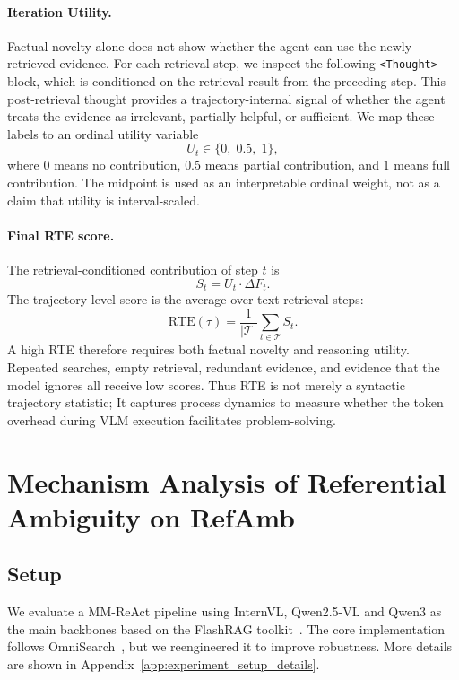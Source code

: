 \documentclass{article} %
\newcommand{\rte}{\mathrm{RTE}}
\newcommand{\df}{\Delta F}
\begin{document}
\paragraph{Iteration Utility.}
Factual novelty alone does not show whether the agent can use the newly retrieved evidence.
For each retrieval step, we inspect the following \texttt{<Thought>} block, which is conditioned on the retrieval result from the preceding step.
This post-retrieval thought provides a trajectory-internal signal of whether the agent treats the evidence as irrelevant, partially helpful, or sufficient.
We map these labels to an ordinal utility variable
\begin{equation}
    U_t \in \{0,\;0.5,\;1\},
    \label{eq:u_t}
\end{equation}
where $0$ means no contribution, $0.5$ means partial contribution, and $1$ means full contribution.
The midpoint is used as an interpretable ordinal weight, not as a claim that utility is interval-scaled.

\paragraph{Final RTE score.}
The retrieval-conditioned contribution of step $t$ is
\begin{equation}
    S_t = U_t \cdot \df_t.
    \label{eq:s_t}
\end{equation}
The trajectory-level score is the average over text-retrieval steps:
\begin{equation}
    \rte(\tau) = \frac{1}{|\mathcal{T}|}\sum_{t\in\mathcal{T}} S_t.
    \label{eq:rte}
\end{equation}
A high RTE therefore requires both factual novelty and reasoning utility.
Repeated searches, empty retrieval, redundant evidence, and evidence that the model ignores all receive low scores.
Thus RTE is not merely a syntactic trajectory statistic; It captures process dynamics to measure whether the token overhead during VLM execution facilitates problem-solving.

\section{Mechanism Analysis of Referential Ambiguity on RefAmb}


\subsection{Setup}
We evaluate a MM-ReAct pipeline using InternVL, Qwen2.5-VL and Qwen3 as the main backbones based on the FlashRAG toolkit~\citep{jin2025flashrag}. The core implementation follows OmniSearch~\citep{li2024benchmarking}, but we reengineered it to improve robustness. More details are shown in Appendix~\ref{app:experiment_setup_details}.
\end{document}
